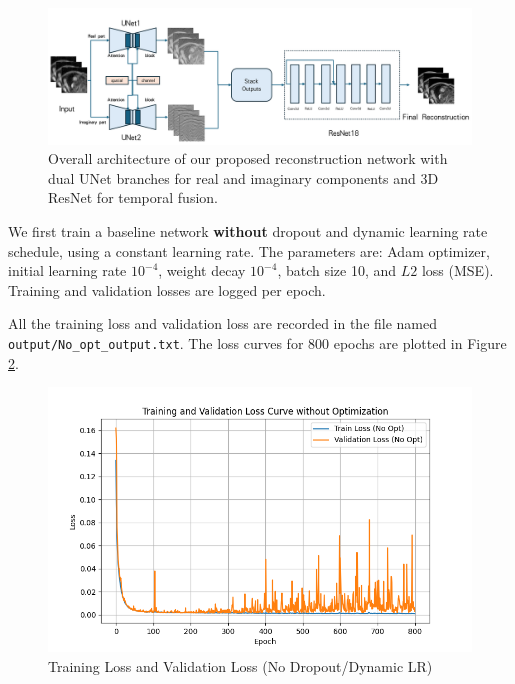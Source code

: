 \documentclass{article}
\begin{document}
\begin{figure}[ht]
  \centering
  \includegraphics[width=\linewidth]{../assets/pipeline.png}
  \caption{Overall architecture of our proposed reconstruction network with dual UNet branches for real and imaginary components and 3D ResNet for temporal fusion.}
  \label{fig:pipeline}
\end{figure}

We first train a baseline network \textbf{without} dropout and dynamic learning rate schedule, using a constant learning rate. The parameters are: Adam optimizer, initial learning rate $10^{-4}$, weight decay $10^{-4}$, batch size 10, and $L2$ loss (MSE). Training and validation losses are logged per epoch.

All the training loss and validation loss are recorded in the file named \texttt{output/No\_opt\_output.txt}.
The loss curves for 800 epochs are plotted in Figure \ref{fig:loss_no_opt}.
\begin{figure}[ht]
  \centering
  \includegraphics[width=\linewidth]{../assets/Training Loss and Validation Loss No opt.png}
  \caption{Training Loss and Validation Loss (No Dropout/Dynamic LR)}
  \label{fig:loss_no_opt}
\end{figure}
\end{document}
